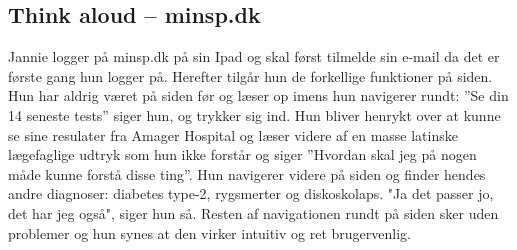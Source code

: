 \subsection*{Think aloud – minsp.dk}
Jannie logger på minsp.dk på sin Ipad og skal først tilmelde sin e-mail da det er første gang hun logger på. Herefter tilgår hun de forkellige funktioner på siden. Hun har aldrig været på siden før og  læser op imens hun navigerer rundt: ”Se din 14 seneste tests” siger hun, og trykker sig ind. Hun bliver henrykt over at kunne se sine resulater fra Amager Hospital og læser videre af en masse latinske lægefaglige udtryk som hun ikke forstår og siger ”Hvordan skal jeg på nogen måde kunne forstå disse ting”. Hun navigerer videre på siden og finder hendes andre diagnoser: diabetes type-2, rygsmerter og diskoskolaps. "Ja det passer jo, det har jeg også", siger hun så. Resten af navigationen rundt på siden sker uden problemer og hun synes at den virker intuitiv og ret brugervenlig. 